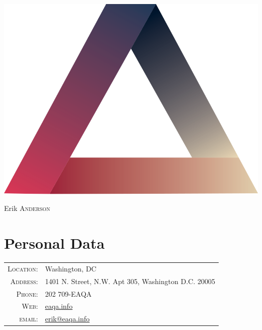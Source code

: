 \documentclass[a4paper,10pt]{article}
\begin{document}
    

\begin{flushright}
\includegraphics[width=.5 in]{Logo2.png}
\end{flushright}

\lhead{}
\chead{\leftmark}
\rhead{}
\cfoot{}
\chead{}
\renewcommand\headrule{}

\par{\centering
		{\Huge Erik \textsc{Anderson}
	}\bigskip\par}

\section{Personal Data}

\begin{tabular}{rl}
    \textsc{Location:} & Washington, DC   \\
    \textsc{Address:}   & 1401 N. Street, N.W. Apt 305, Washington D.C. 20005 \\
    \textsc{Phone:}     & 202 709-EAQA\\
    \textsc{Web:}     & \href{http://EAQA.info/}{eaqa.info}\\
    \textsc{email:}     & \href{mailto:erik@eaqa.info}{erik@eaqa.info}
\end{tabular}

\end{document}
